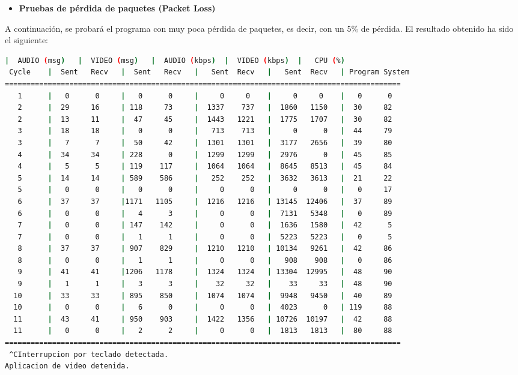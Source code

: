 \begin{itemize}
    \item \textbf{Pruebas de pérdida de paquetes (Packet Loss)}
\end{itemize}

A continuación, se probará el programa con muy poca pérdida de paquetes, es decir, con un 5\% de pérdida. El resultado obtenido ha sido el siguiente:
\vspace{\baselineskip}

\begin{adjustbox}{max width=\textwidth}
\begin{lstlisting}[language=bash,basicstyle=\ttfamily\scriptsize]
          |  AUDIO (msg)   |  VIDEO (msg)   |  AUDIO (kbps)  |  VIDEO (kbps)  |   CPU (%)
 Cycle    |  Sent   Recv   |  Sent   Recv   |   Sent  Recv   |   Sent  Recv   | Program System
============================================================================================
   1      |   0      0     |   0      0     |     0     0    |     0     0    |   0      0
   2      |  29     16     | 118     73     |  1337    737   |  1860   1150   |  30     82
   2      |  13     11     |  47     45     |  1443   1221   |  1775   1707   |  30     82
   3      |  18     18     |   0      0     |   713    713   |     0      0   |  44     79
   3      |   7      7     |  50     42     |  1301   1301   |  3177   2656   |  39     80
   4      |  34     34     | 228      0     |  1299   1299   |  2976      0   |  45     85
   4      |   5      5     | 119    117     |  1064   1064   |  8645   8513   |  45     84
   5      |  14     14     | 589    586     |   252    252   |  3632   3613   |  21     22
   5      |   0      0     |   0      0     |     0      0   |     0      0   |   0     17
   6      |  37     37     |1171   1105     |  1216   1216   | 13145  12406   |  37     89
   6      |   0      0     |   4      3     |     0      0   |  7131   5348   |   0     89
   7      |   0      0     | 147    142     |     0      0   |  1636   1580   |  42      5
   7      |   0      0     |   1      1     |     0      0   |  5223   5223   |   0      5
   8      |  37     37     | 907    829     |  1210   1210   | 10134   9261   |  42     86
   8      |   0      0     |   1      1     |     0      0   |   908    908   |   0     86
   9      |  41     41     |1206   1178     |  1324   1324   | 13304  12995   |  48     90
   9      |   1      1     |   3      3     |    32     32   |    33     33   |  48     90
  10      |  33     33     | 895    850     |  1074   1074   |  9948   9450   |  40     89
  10      |   0      0     |   6      0     |     0      0   |  4023      0   | 119     88
  11      |  43     41     | 950    903     |  1422   1356   | 10726  10197   |  42     88
  11      |   0      0     |   2      2     |     0      0   |  1813   1813   |  80     88
============================================================================================
 ^CInterrupcion por teclado detectada.
Aplicacion de video detenida.


\end{lstlisting}
\end{adjustbox}
